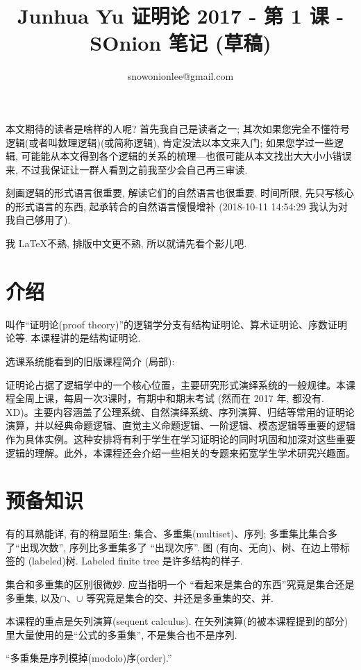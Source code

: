 \documentclass{article}
\title{Junhua Yu 证明论 2017 - 第 1 课 - SOnion 笔记 (草稿)}
\author{snowonionlee@gmail.com}
\date{\DTMnow}
\begin{document}
\maketitle

本文期待的读者是啥样的人呢? 首先我自己是读者之一; 其次如果您完全不懂符号逻辑(或者叫数理逻辑)(或简称逻辑), 肯定没法以本文来入门; 如果您学过一些逻辑, 可能能从本文得到各个逻辑的关系的梳理---也很可能从本文找出大大小小错误来, 不过我保证让一群人看到之前我至少会自己再三审读.

刻画逻辑的形式语言很重要, 解读它们的自然语言也很重要. 时间所限, 先只写核心的形式语言的东西, 起承转合的自然语言慢慢增补 (2018-10-11 14:54:29 我认为对我自己够用了).

我 \LaTeX 不熟, 排版中文更不熟, 所以就请先看个影儿吧.

\section{介绍}

叫作``证明论(proof theory)''的逻辑学分支有结构证明论、算术证明论、序数证明论等. 本课程讲的是结构证明论.

选课系统能看到的旧版课程简介 (局部):

证明论占据了逻辑学中的一个核心位置，主要研究形式演绎系统的一般规律。本课程全周上课，每周一次3课时，有期中和期末考试 (然而在 2017 年, 都没有. XD)。主要内容涵盖了公理系统、自然演绎系统、序列演算、归结等常用的证明论演算，并以经典命题逻辑、直觉主义命题逻辑、一阶逻辑、模态逻辑等重要的逻辑作为具体实例。这种安排将有利于学生在学习证明论的同时巩固和加深对这些重要逻辑的理解。此外，本课程还会介绍一些相关的专题来拓宽学生学术研究兴趣面。

\section{预备知识}

有的耳熟能详, 有的稍显陌生: 集合、多重集(multiset)、序列; 多重集比集合多了``出现次数'', 序列比多重集多了 ``出现次序''. 图 (有向、无向)、树、在边上带标签的 (labeled)树. Labeled finite tree 是许多结构的样子.

集合和多重集的区别很微妙. 应当指明一个 ``看起来是集合的东西''究竟是集合还是多重集, 以及$\cap$、$\cup$ 等究竟是集合的交、并还是多重集的交、并. 

本课程的重点是矢列演算(sequent calculus). 在矢列演算(的被本课程提到的部分)里大量使用的是``公式的多重集'', 不是集合也不是序列.

``多重集是序列模掉(modolo)序(order).''
\end{document}
